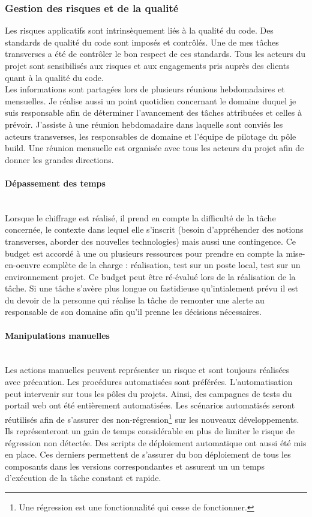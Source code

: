 \documentclass[12pt,a4paper]{article}
\begin{document}
\subsubsection{Gestion des risques et de la qualité}
Les risques applicatifs sont intrinsèquement liés à la qualité du code. Des standards de qualité du code sont imposés et contrôlés. Une de mes tâches transverses a été de contrôler le bon respect de ces standards. Tous les acteurs du projet sont sensibilisés aux risques et aux engagements pris auprès des clients quant à la qualité du code.\\
Les informations sont partagées lors de plusieurs réunions hebdomadaires et mensuelles. Je réalise aussi un point quotidien concernant le domaine duquel je suis responsable afin de déterminer l'avancement des tâches attribuées et celles à prévoir. J'assiste à une réunion hebdomadaire dans laquelle sont conviés les acteurs transverses, les responsables de domaine et l'équipe de pilotage du pôle build. Une réunion mensuelle est organisée avec tous les acteurs du projet afin de donner les grandes directions.
\paragraph{Dépassement des temps}
~~\\
Lorsque le chiffrage est réalisé, il prend en compte la difficulté de la tâche concernée, le contexte dans lequel elle s'inscrit (besoin d'appréhender des notions transverses,  aborder des nouvelles technologies) mais aussi une contingence. Ce budget est accordé à une ou plusieurs ressources pour prendre en compte la mise-en-oeuvre complète de la charge : réalisation, test sur un poste local, test sur un environnement projet. Ce budget peut être ré-évalué lors de la réalisation de la tâche. Si une tâche s'avère plus longue ou fastidieuse qu'intialement prévu il est du devoir de la personne qui réalise la tâche de remonter une alerte au responsable de son domaine afin qu'il prenne les décisions nécessaires.
\paragraph{Manipulations manuelles}
~~\\
Les actions manuelles peuvent représenter un risque et sont toujours réalisées avec précaution. Les procédures automatisées sont préférées. L'automatisation peut intervenir sur tous les pôles du projets. Ainsi, des campagnes de tests du portail web ont été entièrement automatisées. Les scénarios automatisés seront réutilisés afin de s'assurer des non-régression\footnote{Une régression est une fonctionnalité qui cesse de fonctionner.} sur les nouveaux développements. Ils représenteront un gain de temps considérable en plus de limiter le risque de régression non détectée. Des scripts de déploiement automatique ont aussi été mis en place. Ces derniers permettent de s'assurer du bon déploiement de tous les composants dans les versions correspondantes et assurent un un temps d'exécution de la tâche constant et rapide.  
\end{document}

